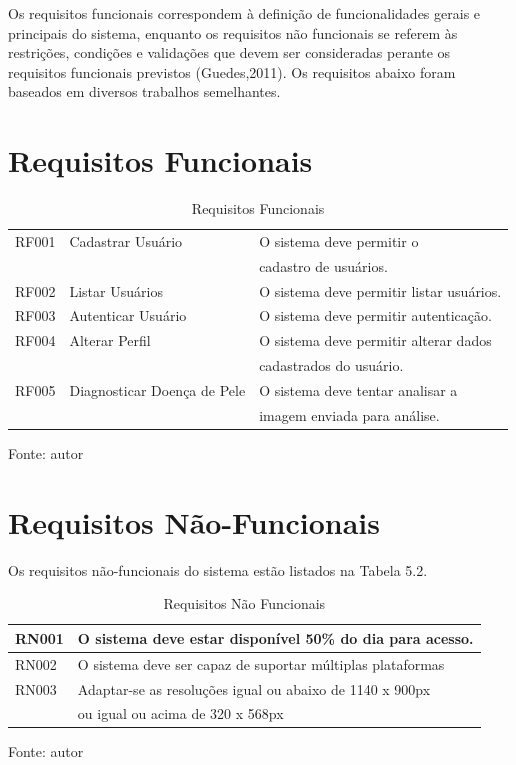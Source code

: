 \documentclass[openright]{ifrs} %
\begin{document}
Os requisitos funcionais correspondem à definição de funcionalidades gerais e principais
do sistema, enquanto os requisitos não funcionais se referem às restrições, condições
e validações que devem ser consideradas perante os requisitos funcionais previstos (Guedes,2011). Os requisitos abaixo foram baseados em diversos trabalhos semelhantes.



\section{Requisitos Funcionais}


\begin{table}[h]
\caption{Requisitos Funcionais}
\begin{center}
\begin{tabular}{|l|l|l|}
\hline RF001 &  Cadastrar Usuário  &  O sistema deve permitir o \\  & & cadastro de usuários.\\
\hline RF002 &  Listar Usuários  & O sistema deve permitir listar usuários.\\
\hline RF003 &  Autenticar Usuário  & O sistema deve permitir autenticação.\\
\hline RF004 &  Alterar Perfil  & O sistema deve permitir alterar dados \\  & & cadastrados do usuário.\\
\hline RF005 & Diagnosticar Doença de Pele  & O sistema deve tentar analisar a  \\  & & imagem enviada para análise.\\


\hline 
\end{tabular}
\centerline{Fonte: autor}
\end{center}
\end{table}    



\section{Requisitos Não-Funcionais}
   Os requisitos não-funcionais do sistema estão listados na Tabela 5.2.

\begin{table} [h]
\caption{Requisitos Não Funcionais}
\begin{center}
\begin{tabular}{|l|l|}
\hline RN001 &  O sistema deve estar disponível 50\% do dia para acesso.\\
\hline RN002 &  O sistema deve ser capaz de suportar múltiplas plataformas   \\
\hline RN003 &  Adaptar-se as resoluções igual ou abaixo de 1140 x 900px \\ 
 & ou igual ou acima de 320 x 568px   \\
\hline 
\end{tabular}
\centerline{Fonte: autor}
\end{center}
\end{table}    
    
\end{document}
